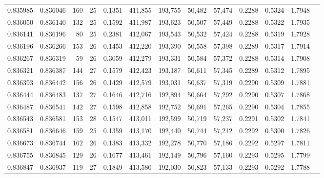 \begin{tabular}{rrrrrrrrrrrrr}
0.835985 & 0.836046 &   160 &  25 &                                     0.1351 & 411,855 & 193,755 &  50,482 &  57,474 & 0.2288 & 0.5324 & 1.7948 \\
0.836050 & 0.836140 &   132 &  25 &                                     0.1592 & 411,987 & 193,623 &  50,507 &  57,449 & 0.2288 & 0.5322 & 1.7935 \\
0.836141 & 0.836196 &    80 &  25 &                                     0.2381 & 412,067 & 193,543 &  50,532 &  57,424 & 0.2288 & 0.5319 & 1.7928 \\
0.836196 & 0.836266 &   153 &  26 &                                     0.1453 & 412,220 & 193,390 &  50,558 &  57,398 & 0.2289 & 0.5317 & 1.7914 \\
0.836267 & 0.836319 &    59 &  26 &                                     0.3059 & 412,279 & 193,331 &  50,584 &  57,372 & 0.2288 & 0.5314 & 1.7908 \\
0.836321 & 0.836387 &   144 &  27 &                                     0.1579 & 412,423 & 193,187 &  50,611 &  57,345 & 0.2289 & 0.5312 & 1.7895 \\
0.836393 & 0.836442 &   156 &  26 &                                     0.1429 & 412,579 & 193,031 &  50,637 &  57,319 & 0.2290 & 0.5309 & 1.7881 \\
0.836444 & 0.836483 &   137 &  27 &                                     0.1646 & 412,716 & 192,894 &  50,664 &  57,292 & 0.2290 & 0.5307 & 1.7868 \\
0.836487 & 0.836541 &   142 &  27 &                                     0.1598 & 412,858 & 192,752 &  50,691 &  57,265 & 0.2290 & 0.5304 & 1.7855 \\
0.836543 & 0.836581 &   153 &  28 &                                     0.1547 & 413,011 & 192,599 &  50,719 &  57,237 & 0.2291 & 0.5302 & 1.7841 \\
0.836581 & 0.836646 &   159 &  25 &                                     0.1359 & 413,170 & 192,440 &  50,744 &  57,212 & 0.2292 & 0.5300 & 1.7826 \\
0.836673 & 0.836744 &   162 &  26 &                                     0.1383 & 413,332 & 192,278 &  50,770 &  57,186 & 0.2292 & 0.5297 & 1.7811 \\
0.836755 & 0.836845 &   129 &  26 &                                     0.1677 & 413,461 & 192,149 &  50,796 &  57,160 & 0.2293 & 0.5295 & 1.7799 \\
0.836847 & 0.836937 &   119 &  27 &                                     0.1849 & 413,580 & 192,030 &  50,823 &  57,133 & 0.2293 & 0.5292 & 1.7788 \\

\end{tabular}

